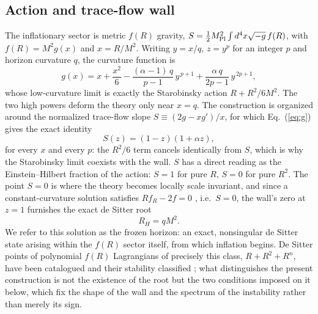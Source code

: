 \documentclass[aps,prd,twocolumn,superscriptaddress,nofootinbib,longbibliography]{revtex4-2}
\newcommand{\Mpl}{M_{\rm Pl}}
\begin{document}
\subsection{Action and trace-flow wall}
The inflationary sector is metric $f(R)$ gravity,
$S=\tfrac12\Mpl^2\int d^4x\sqrt{-g}\,f(R)$, with $f(R)=M^2 g(x)$ and
$x=R/M^2$. Writing $y=x/q$, $z=y^p$ for an integer $p$ and horizon curvature
$q$, the curvature function is
\begin{equation}
g(x)=x+\frac{x^2}{6}
-\frac{(\alpha-1)\,q}{p-1}\,y^{\,p+1}
+\frac{\alpha\,q}{2p-1}\,y^{\,2p+1},
\label{eq:g}
\end{equation}
whose low-curvature limit is exactly the Starobinsky action
$R+R^2/6M^2$. The two high powers deform the theory only near $x=q$. The
construction is organized around the normalized trace-flow slope
$S\equiv(2g-xg')/x$, for which Eq.~(\ref{eq:g}) gives the exact identity
\begin{equation}
S(z)=(1-z)(1+\alpha z),
\label{eq:wall}
\end{equation}
for every $x$ and every $p$: the $R^2/6$ term cancels identically from $S$,
which is why the Starobinsky limit coexists with the wall. $S$ has a direct
reading as the Einstein--Hilbert fraction of the action: $S=1$ for pure $R$,
$S=0$ for pure $R^2$. The point $S=0$ is where the theory becomes locally
scale invariant, and since a constant-curvature solution satisfies
$Rf_R-2f=0$ \cite{BarrowOttewill1983}, i.e.\ $S=0$, the wall's zero at $z=1$
furnishes the exact de Sitter root
\begin{equation}
R_H=qM^2 .
\end{equation}
We refer to this solution as the frozen horizon: an exact, nonsingular de
Sitter state arising within the $f(R)$ sector itself, from which inflation
begins. De Sitter points of polynomial $f(R)$ Lagrangians of precisely this
class, $R+R^2+R^n$, have been catalogued and their stability classified
\cite{Pham2024,Huang2013,Artymowski2015}; what distinguishes the present
construction is not the existence of the root but the two conditions imposed
on it below, which fix the shape of the wall and the spectrum of the
instability rather than merely its sign.
\end{document}

